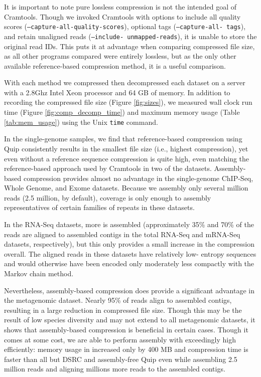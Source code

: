 \documentclass[twocolumn]{article}
\begin{document}

It is important to note pure lossless compression is not the intended goal of
Cramtools. Though we invoked Cramtools with options to include all quality
scores (\texttt{--capture-all-quality-scores}), optional tags (\texttt
{--capture-all- tags}), and retain unaligned reads (\texttt{--include-
unmapped-reads}), it is unable to store the original read IDs. This puts it at
advantage when comparing compressed file size, as all other programs compared
were entirely lossless, but as the only other available reference-based
compression method, it is a useful comparison.


With each method we compressed then decompressed each dataset on a server with
a 2.8Ghz Intel Xeon processor and 64 GB of memory. In addition to recording
the compressed file size (Figure \ref{fig:sizes}), we measured wall clock run
time (Figure \ref{fig:comp_decomp_time}) and maximum memory usage (Table
\ref{tab:mem_usage}) using the Unix \texttt{time} command.

In the single-genome samples, we find that reference-based compression using
Quip consistently results in the smallest file size (i.e., highest
compression), yet even without a reference sequence compression is quite high,
even matching the reference-based approach used by Cramtools in two of the
datasets. Assembly-based compression provides almost no advantage in the
single-genome ChIP-Seq, Whole Genome, and Exome datasets. Because we assembly
only several million reads (2.5 million, by default), coverage is only enough
to assembly representatives of certain families of repeats in these datasets.

In the RNA-Seq datasets, more is assembled (approximately 35\% and 70\% of the
reads are aligned to assembled contigs in the total RNA-Seq and mRNA-Seq
datasets, respectively), but this only provides a small increase in the
compression overall. The aligned reads in these datasets have relatively low-
entropy sequences and would otherwise have been encoded only moderately less
compactly with the Markov chain method.

Nevertheless, assembly-based compression does provide a significant advantage
in the metagenomic dataset. Nearly 95\% of reads align to assembled contigs,
resulting in a large reduction in compressed file size. Though this may be the
result of low species diversity and may not extend to all metagenomic
datasets, it shows that assembly-based compression is beneficial in certain
cases. Though it comes at some cost, we are able to perform assembly with
exceedingly  high efficiently: memory usage in increased only by 400 MB and
compression time is faster than all but DSRC and assembly-free Quip even while
assembling 2.5 million reads and aligning millions more reads to the assembled
contigs.
\end{document}
